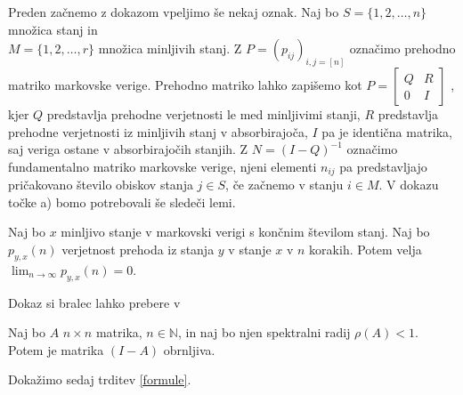 \documentclass[twoside,11pt]{article}
\begin{document}
\noindent
Preden začnemo z dokazom vpeljimo še nekaj oznak. Naj bo $S = \{1,2,\ldots,n\}$ množica stanj in \\ $M = \{1,2,\ldots,r\}$ množica minljivih stanj. Z $P = (p_{ij})_{i,j=[n]}$ označimo prehodno matriko markovske verige. Prehodno matriko lahko zapišemo kot 
$ P =
\begin{bmatrix} 
    Q & R \\
    0 & I 
\end{bmatrix}
$
    , kjer $Q$ predstavlja prehodne verjetnosti le med minljivimi stanji, $R$ predstavlja prehodne verjetnosti iz minljivih stanj v absorbirajoča, $I$ pa je identična matrika, saj veriga ostane v absorbirajočih stanjih. Z $N = (I-Q)^{-1}$ označimo fundamentalno matriko markovske verige, njeni elementi $n_{ij}$  pa predstavljajo pričakovano število obiskov stanja $j\in S$, če začnemo v stanju $i\in M$. V dokazu točke a) bomo potrebovali še sledeči lemi.  
\smallskip

\begin{lema}\label{markovske}
    Naj bo $x$ minljivo stanje v markovski verigi s končnim številom stanj. Naj bo $p_{y,x}(n)$ verjetnost prehoda iz stanja $y$ v stanje $x$ v $n$ korakih. Potem velja $\lim_{n \to \infty} p_{y,x}(n) = 0$.
\end{lema}

\noindent Dokaz si bralec lahko prebere v 
\begin{lema}\label{matrike}
    Naj bo $A$ $n\times n$ matrika, $n \in \mathbb{N}$, in naj bo njen spektralni radij $\rho(A)<1$. Potem je matrika $(I-A)$ obrnljiva.
\end{lema}


\noindent Dokažimo sedaj trditev \ref{formule}. \newline
\smallskip
\end{document}
